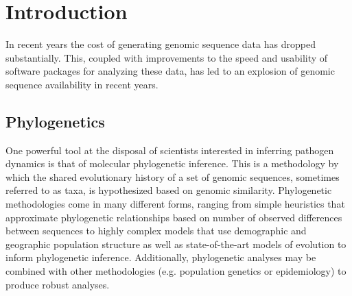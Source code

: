 \chapter{Introduction}\label{ch:introduction}



In recent years the cost of generating genomic sequence data has dropped substantially.
This, coupled with improvements to the speed and usability of software packages for analyzing these data, has led to an explosion of genomic sequence availability in recent years.


\section{Phylogenetics}

One powerful tool at the disposal of scientists interested in inferring pathogen dynamics is that of molecular phylogenetic inference.
This is a methodology by which the shared evolutionary history of a set of genomic sequences, sometimes referred to as taxa, is hypothesized based on genomic similarity.
Phylogenetic methodologies come in many different forms, ranging from simple heuristics that approximate phylogenetic relationships based on number of observed differences between sequences\cite{felsenstein2003inferring} to highly complex models that use demographic and geographic population structure as well as state-of-the-art models of evolution to inform phylogenetic inference\cite{someStructuredCoalescentPaper}.
Additionally, phylogenetic analyses may be combined with other methodologies (e.g. population genetics\cite{someGoodDemographyPaper} or epidemiology\cite{blackGenEpi}) to produce robust analyses.


